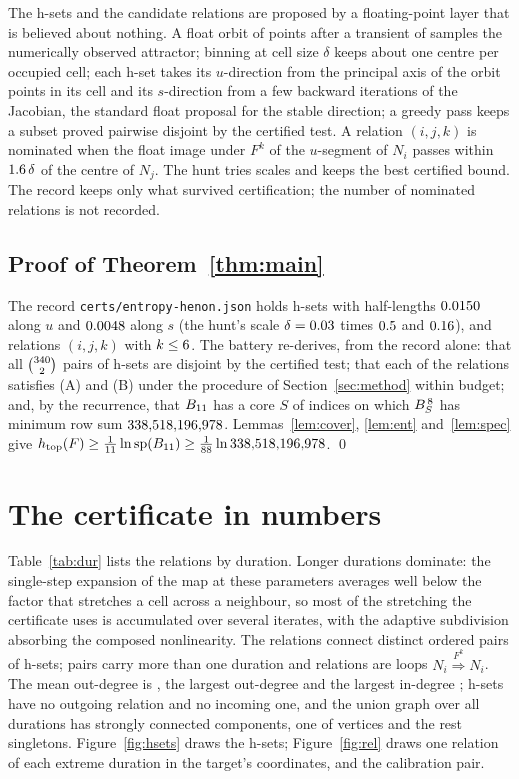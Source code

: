 \documentclass[11pt]{article}
\newcommand{\htop}{h_{\mathrm{top}}}
\newcommand{\sprad}{\operatorname{sp}}
\newcommand{\cover}[1]{\stackrel{#1}{\Longrightarrow}}
\begin{document}
The h-sets and the candidate relations are proposed by a floating-point layer that is believed about nothing. A
float orbit of \OrbitPoints{} points after a transient of \Transient{} samples the numerically observed attractor;
binning at cell size $\delta$ keeps about one centre per occupied cell; each h-set takes its $u$-direction from the
principal axis of the orbit points in its cell and its $s$-direction from a few backward iterations of the
Jacobian, the standard float proposal for the stable direction; a greedy pass keeps a subset proved pairwise
disjoint by the certified test. A relation $(i,j,k)$ is nominated when the float image under $F^k$ of the
$u$-segment of $N_i$ passes within $1.6\,\delta$ of the centre of $N_j$. The hunt tries \NScales{} scales and
keeps the best certified bound. The record keeps only what survived certification; the number of nominated
relations is not recorded.

\subsection{Proof of Theorem~\ref{thm:main}}

The record \texttt{certs/entropy-henon.json} holds \NBoxes{} h-sets with half-lengths $0.0150$ along $u$ and
$0.0048$ along $s$ (the hunt's scale $\delta=0.03$ times $0.5$ and $0.16$), and \NEdges{} relations
$(i,j,k)$ with $k\le6$. The battery re-derives, from the record alone: that all $\binom{340}{2}$ pairs of
h-sets are disjoint by the certified test; that each of the \NEdges{} relations satisfies (A) and (B) under the
procedure of Section~\ref{sec:method} within budget; and, by the recurrence, that $B_{11}$ has a core $S$
of \CoreSize{} indices on which $B_S^{\,8}$ has minimum row sum $338{,}518{,}196{,}978$. Lemmas~\ref{lem:cover},
\ref{lem:ent} and~\ref{lem:spec} give
$\htop(F)\ge\frac1{\ComposedK}\ln\sprad(B_{\ComposedK})\ge\frac{1}{\MKProduct}\ln\MinRowSum$. \qed

\section{The certificate in numbers}\label{sec:cert}

Table~\ref{tab:dur} lists the relations by duration. Longer durations dominate: the single-step expansion of the
map at these parameters averages well below the factor that stretches a cell across a neighbour, so most of the
stretching the certificate uses is accumulated over several iterates, with the adaptive subdivision absorbing the
composed nonlinearity. The relations connect \NPairs{} distinct ordered pairs of h-sets; \NMultiPairs{} pairs carry
more than one duration and \NSelfLoops{} relations are loops $N_i\cover{F^k}N_i$. The mean out-degree is \MeanOut,
the largest out-degree \MaxOut{} and the largest in-degree \MaxIn; \NNoOut{} h-sets have no outgoing relation and
\NNoIn{} no incoming one, and the union graph over all durations has \UnionSCCs{} strongly connected components, one
of \UnionSCCLargest{} vertices and the rest singletons. Figure~\ref{fig:hsets} draws the h-sets; Figure~\ref{fig:rel}
draws one relation of each extreme duration in the target's coordinates, and the calibration pair.
\end{document}
